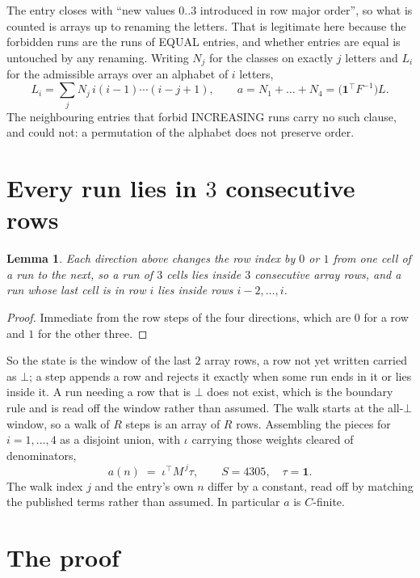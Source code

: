\documentclass[11pt,a4paper]{article}
\theoremstyle{plain}
\newtheorem{lemma}[theorem]{Lemma}
\theoremstyle{definition}
\begin{document}
The entry closes with ``new values $0..3$ introduced in row major order'', so what is counted
is arrays up to renaming the letters. That is legitimate here because the forbidden runs are
the runs of EQUAL entries, and whether entries are equal is untouched by any renaming. Writing
$N_j$ for the classes on exactly $j$ letters and $L_i$ for the admissible arrays over an
alphabet of $i$ letters,
\[
L_i=\sum_j N_j\,i(i-1)\cdots(i-j+1),\qquad
a=N_1+\dots+N_{4}=\bigl(\mathbf{1}^{\!\top}F^{-1}\bigr)L .
\]
The neighbouring entries that forbid INCREASING runs carry no such clause, and could not: a
permutation of the alphabet does not preserve order.

\section{Every run lies in $3$ consecutive rows}

\begin{lemma}\label{lem:win}
Each direction above changes the row index by $0$ or $1$ from one cell of a run to the next, so
a run of $3$ cells lies inside $3$ consecutive array rows, and a run whose last cell is in
row $i$ lies inside rows $i-2,\dots,i$.
\end{lemma}

\begin{proof}
Immediate from the row steps of the four directions, which are $0$ for a row and $1$ for the
other three.
\end{proof}

So the state is the window of the last $2$ array rows, a row not yet written carried as
$\bot$; a step appends a row and rejects it exactly when some run ends in it or lies inside it.
A run needing a row that is $\bot$ does not exist, which is the boundary rule and is read off
the window rather than assumed. The walk starts at the all-$\bot$ window, so a walk of $R$ steps
is an array of $R$ rows. Assembling the pieces for $i=1,\dots,4$ as a disjoint union, with $\iota$ carrying those weights cleared of denominators,
\[
a(n)\;=\;\iota^{\!\top}M^{\,j}\tau ,\qquad S=4305,\quad\tau=\mathbf{1} .
\]
The walk index $j$ and the entry's own $n$ differ by a constant, read off by matching the
published terms rather than assumed. In particular $a$ is $C$-finite.

\section{The proof}
\end{document}
